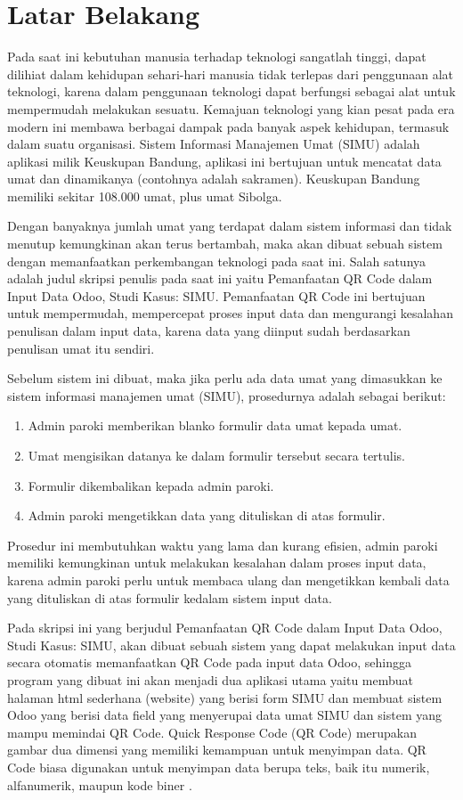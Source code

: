 \documentclass[a4paper,twoside]{article}
\begin{document}
\section{Latar Belakang}
Pada saat ini kebutuhan manusia terhadap teknologi sangatlah tinggi, dapat dilihiat dalam kehidupan sehari-hari manusia tidak terlepas dari penggunaan alat teknologi, karena dalam penggunaan teknologi dapat berfungsi sebagai alat untuk mempermudah melakukan sesuatu. Kemajuan teknologi yang kian pesat pada era modern ini membawa berbagai dampak pada banyak aspek kehidupan, termasuk dalam suatu organisasi. Sistem Informasi Manajemen Umat (SIMU) adalah aplikasi milik Keuskupan Bandung, aplikasi ini bertujuan untuk mencatat data umat dan dinamikanya (contohnya adalah sakramen). Keuskupan Bandung memiliki sekitar 108.000 umat, plus umat Sibolga.

Dengan banyaknya jumlah umat yang terdapat dalam sistem informasi dan tidak menutup kemungkinan akan terus bertambah, maka akan dibuat sebuah sistem dengan memanfaatkan perkembangan teknologi pada saat ini. Salah satunya adalah judul skripsi penulis pada saat ini yaitu Pemanfaatan QR Code dalam Input Data Odoo, Studi Kasus: SIMU. Pemanfaatan QR Code ini bertujuan untuk mempermudah, mempercepat proses input data dan mengurangi kesalahan penulisan dalam input data, karena data yang diinput sudah berdasarkan penulisan umat itu sendiri.

Sebelum sistem ini dibuat, maka jika perlu ada data umat yang dimasukkan ke sistem informasi manajemen umat (SIMU), prosedurnya adalah sebagai berikut:
\begin{enumerate}
	\item Admin paroki memberikan blanko formulir data umat kepada umat.
	\item Umat mengisikan datanya ke dalam formulir tersebut secara tertulis.
	\item Formulir dikembalikan kepada admin paroki. 
	\item Admin paroki mengetikkan data yang dituliskan di atas formulir.
\end{enumerate}
Prosedur ini membutuhkan waktu yang lama dan kurang efisien, admin paroki memiliki kemungkinan untuk melakukan kesalahan dalam proses input data, karena admin paroki perlu untuk membaca ulang dan mengetikkan kembali data yang dituliskan di atas formulir kedalam sistem input data.

Pada skripsi ini yang berjudul Pemanfaatan QR Code dalam Input Data Odoo, Studi Kasus: SIMU, akan dibuat sebuah sistem yang dapat melakukan input data secara otomatis memanfaatkan QR Code pada input data Odoo, sehingga program yang dibuat ini akan menjadi dua aplikasi utama yaitu membuat halaman html sederhana (website) yang berisi form SIMU dan membuat sistem Odoo yang berisi data field yang menyerupai data umat SIMU dan sistem yang mampu memindai QR Code. Quick Response Code (QR Code) merupakan gambar dua dimensi yang memiliki kemampuan untuk menyimpan data. QR Code biasa digunakan untuk menyimpan data berupa teks, baik itu numerik, alfanumerik, maupun kode biner \cite{qrcode:13:median}.
\end{document}
